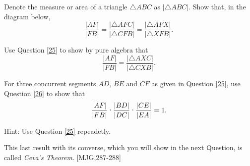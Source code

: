 \documentclass{ximera}
\begin{document}
\begin{question}
\label{25} Denote the measure or area of a triangle $\triangle
ABC$ as $\left\vert \triangle ABC\right\vert $. Show that, in the
diagram below,
\[
\frac{\left\vert AF\right\vert }{\left\vert FB\right\vert }=\frac{\left\vert
\triangle AFC\right\vert }{\left\vert \triangle CFB\right\vert }%
=\frac{\left\vert \triangle AFX\right\vert }{\left\vert \triangle
XFB\right\vert }.
\]
\begin{image}
\end{image}
\end{question}

\begin{question}
\label{26} Use Question \ref{25} to show by pure algebra that%
\begin{equation}
\frac{\left\vert AF\right\vert }{\left\vert FB\right\vert }=\frac{\left\vert
\triangle AXC\right\vert }{\left\vert \triangle CXB\right\vert }. \label{27}%
\end{equation}

\end{question}

\begin{question}
\label{28}  For three concurrent segments $\overline{AD}$,
$\overline{BE}$ and $\overline{CF}$ as given in Question \ref{25}, use
Question \ref{26} to show that%
\[
\frac{\left\vert AF\right\vert }{\left\vert FB\right\vert }%
\text{\textperiodcentered}\frac{\left\vert BD\right\vert }{\left\vert
DC\right\vert }\text{\textperiodcentered}\frac{\left\vert CE\right\vert
}{\left\vert EA\right\vert }=1.
\]


Hint: Use Question \ref{25} repeadetly. 
\end{question}

This last result with its converse, which you will show in the next Question,
is called \textit{Ceva's Theorem}. [MJG,287-288]
\end{document}
